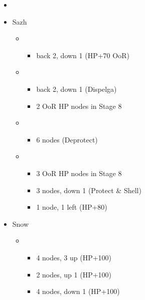 \begin{menu}
	\begin{itemize}
	\paradigm
		\begin{itemize}
			\item {}%
				{\paradigmline{\com}{\com}{\med}}%
				{\paradigmline[4]{\com}{\com}{\sab}}%
				{\paradigmline{\syn}{\sen}{(\sab)}}%
				{\paradigmline{(\rav)}{\rav}{(\rav)}}%
				{\paradigmline{\com}{\sen}{\sab}}%
				{\paradigmline{\rav}{(\sen)}{(\rav)}}%
		\end{itemize}
	\crystarium
		\begin{itemize}
			\item Sazh
				\begin{itemize}
					\item \com
						\begin{itemize}
							\item back 2, down 1 (HP+70 OoR)
						\end{itemize}
					\item \rav
						\begin{itemize}
							\item back 2, down 1 (Dispelga)
							\item 2 OoR HP nodes in Stage 8
						\end{itemize}
					\item \sab
						\begin{itemize}
							\item 6 nodes (Deprotect)
						\end{itemize}
					\item \syn
						\begin{itemize}
							\item 3 OoR HP nodes in Stage 8
							\item 3 nodes, down 1 (Protect \& Shell)
							\item 1 node, 1 left (HP+80)
						\end{itemize}
				\end{itemize}
			\item Snow
				\begin{itemize}
					\item \sen
						\begin{itemize}
							\item 4 nodes, 3 up (HP+100)
							\item 2 nodes, up 1 (HP+100)
							\item 4 nodes, down 1 (HP+100)
						\end{itemize}

\end{itemize}
\end{itemize}
\end{itemize}
\end{menu}
